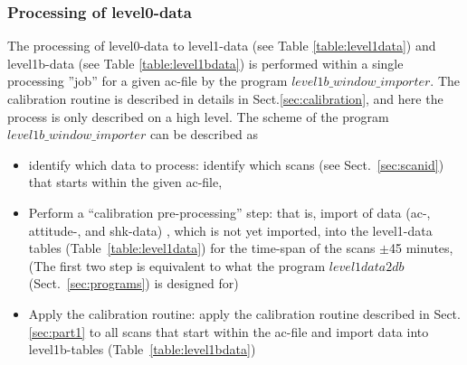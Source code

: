 \documentclass[12pt]{article}
\begin{document}
\subsubsection{Processing of level0-data}
\label{sec:level0processing}
The processing of level0-data to level1-data (see Table \ref{table:level1data}) 
and level1b-data (see Table \ref{table:level1bdata}) is performed
within a single processing ''job'' for a given ac-file 
by the program \(level1b\_window\_importer\).
The calibration routine is described in details in Sect.\ref{sec:calibration},
and here the process is only described on a high level.
The scheme of the program \(level1b\_window\_importer\) 
can be described as
\begin{itemize}
\item identify which data to process:\newline
identify which scans (see Sect.~\ref{sec:scanid}) that starts 
within the given ac-file,
\item Perform a ``calibration pre-processing'' step:\newline
that is, import of data (ac-, attitude-, and shk-data) , which is not 
yet imported, into the level1-data tables (Table~\ref{table:level1data}) 
for the time-span of the scans \(\pm\)45 minutes,
(The first two step is equivalent to what the program \(level1data2db\)
(Sect.~\ref{sec:programs}) is designed for)
\item Apply the calibration routine:\newline
apply the calibration routine described in Sect.\ref{sec:part1}
to all scans that start within the ac-file and import data into level1b-tables
(Table~\ref{table:level1bdata})

\end{itemize}
\end{document}
